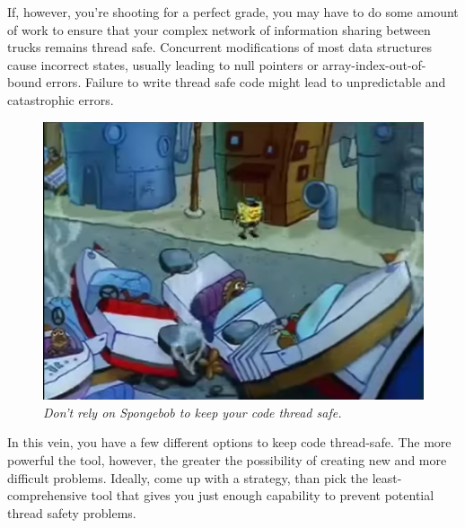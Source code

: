 \documentclass[11pt]{article}
\begin{document}
If, however, you're shooting for a perfect grade, you may have to do some amount of work to ensure that your complex network of information sharing between trucks remains thread safe. Concurrent modifications of most data structures cause incorrect states, usually leading to null pointers or array-index-out-of-bound errors. Failure to write thread safe code might lead to unpredictable and catastrophic errors.\\
\begin{figure}[h]
\centerline{\includegraphics[scale=0.5]{collision.png}} 
\caption{\em{Don't rely on Spongebob to keep your code thread safe.}}
\end{figure}

In this vein, you have a few different options to keep code thread-safe. The more powerful the tool, however, the greater the possibility of creating new and more difficult problems. Ideally, come up with a strategy, than pick the least-comprehensive tool that gives you just enough capability to prevent potential thread safety problems.
\end{document}
